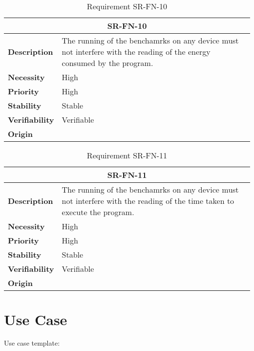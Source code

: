 \begin{table}[H]
    \centering
    \begin{tabular}{l p{10cm}}
        \toprule
        \multicolumn{2}{c}{SR-FN-10} \\
        \toprule
        \textbf{Description}        &  The running of the benchamrks on any device must not interfere with the reading of the energy consumed by the program. \\
        \textbf{Necessity}          &  High \\
        \textbf{Priority}           &  High \\
        \textbf{Stability}          &  Stable \\
        \textbf{Verifiability}      & Verifiable \\
        \textbf{Origin}             & \textit{\nameref{tab:ur-ca-09}} \\
    \end{tabular}
    \caption{Requirement SR-FN-10}
    \label{tab:sr-fn-10}
\end{table}

\begin{table}[H]
    \centering
    \begin{tabular}{l p{10cm}}
        \toprule
        \multicolumn{2}{c}{SR-FN-11} \\
        \toprule
        \textbf{Description}        &  The running of the benchamrks on any device must not interfere with the reading of the time taken to execute the program. \\
        \textbf{Necessity}          &  High \\
        \textbf{Priority}           &  High \\
        \textbf{Stability}          &  Stable \\
        \textbf{Verifiability}      & Verifiable \\
        \textbf{Origin}             & \textit{\nameref{tab:ur-ca-09}} \\
    \end{tabular}
    \caption{Requirement SR-FN-11}
    \label{tab:sr-fn-11}
\end{table}

\section{Use Case}
\checkmark



Use case template:

